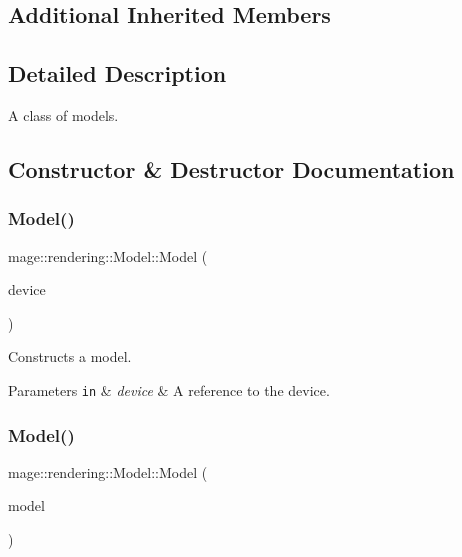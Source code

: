 \subsection*{Additional Inherited Members}


\subsection{Detailed Description}
A class of models. 

\subsection{Constructor \& Destructor Documentation}
\mbox{\label{classmage_1_1rendering_1_1_model_a7f135a6ed7604655e94d3264bd9d5c62}} 
\subsubsection{\texorpdfstring{Model()}{Model()}\hspace{0.1cm}{\footnotesize\ttfamily [1/3]}}
{\footnotesize\ttfamily mage\+::rendering\+::\+Model\+::\+Model (\begin{DoxyParamCaption}\item[{I\+D3\+D11\+Device \&}]{device }\end{DoxyParamCaption})\hspace{0.3cm}{\ttfamily [explicit]}}

Constructs a model.


\begin{DoxyParams}[1]{Parameters}
\mbox{\tt in}  & {\em device} & A reference to the device. \\
\hline
\end{DoxyParams}
\mbox{\label{classmage_1_1rendering_1_1_model_a59a64dc710efaa44b9f256883d0ab9cb}} 
\subsubsection{\texorpdfstring{Model()}{Model()}\hspace{0.1cm}{\footnotesize\ttfamily [2/3]}}
{\footnotesize\ttfamily mage\+::rendering\+::\+Model\+::\+Model (\begin{DoxyParamCaption}\item[{const \mbox{\hyperlink{classmage_1_1rendering_1_1_model}{Model}} \&}]{model }\end{DoxyParamCaption})\hspace{0.3cm}{\ttfamily [delete]}}

